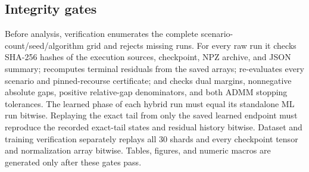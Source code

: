 \documentclass[preprint,12pt,3p]{elsarticle}
\theoremstyle{definition}
\begin{document}
\subsection{Integrity gates}
Before analysis, verification enumerates the complete scenario-count/seed/algorithm grid and rejects missing runs. For every raw run it checks SHA-256 hashes of the execution sources, checkpoint, NPZ archive, and JSON summary; recomputes terminal residuals from the saved arrays; re-evaluates every scenario and pinned-recourse certificate; and checks dual margins, nonnegative absolute gaps, positive relative-gap denominators, and both ADMM stopping tolerances. The learned phase of each hybrid run must equal its standalone ML run bitwise. Replaying the exact tail from only the saved learned endpoint must reproduce the recorded exact-tail states and residual history bitwise. Dataset and training verification separately replays all 30 shards and every checkpoint tensor and normalization array bitwise. Tables, figures, and numeric macros are generated only after these gates pass.
\end{document}

